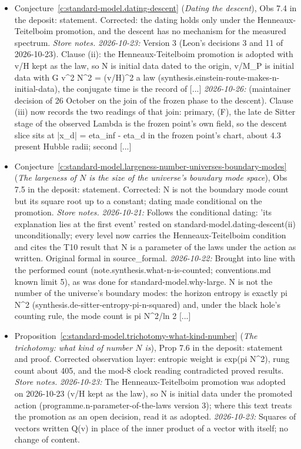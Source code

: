 \documentclass[11pt]{article}
\theoremstyle{definition}
\theoremstyle{plain}
\begin{document}
\begin{itemize}
\item Conjecture~\ref{c:standard-model.dating-descent} (\emph{Dating the descent}), Obs 7.4 in the deposit: statement. Corrected: the dating holds only under the Henneaux-Teitelboim promotion, and the descent has no mechanism for the measured spectrum. \emph{Store notes.} \emph{2026-10-23:} Version 3 (Leon's decisions 3 and 11 of 2026-10-23). Clause (ii): the Henneaux-Teitelboim promotion is adopted with v/H kept as the law, so N is initial data dated to the origin, v/M\_P is initial data with G v\^{}2 N\^{}2 = (v/H)\^{}2 a law (synthesis.einstein-route-makes-n-initial-data), the conjugate time is the record of [...] \emph{2026-10-26:} (maintainer decision of 26 October on the join of the frozen phase to the descent). Clause (iii) now records the two readings of that join: primary, (F), the late de Sitter stage of the observed Lambda is the frozen point's own field, so the descent slice sits at |x\_d| = eta\_inf - eta\_d in the frozen point's chart, about 4.3 present Hubble radii; second [...]
\item Conjecture~\ref{c:standard-model.largeness-number-universes-boundary-modes} (\emph{The largeness of $N$ is the size of the universe's boundary mode space}), Obs 7.5 in the deposit: statement. Corrected: N is not the boundary mode count but its square root up to a constant; dating made conditional on the promotion. \emph{Store notes.} \emph{2026-10-21:} Follows the conditional dating: 'its explanation lies at the first event' rested on standard-model.dating-descent(ii) unconditionally; every level now carries the Henneaux-Teitelboim condition and cites the T10 result that N is a parameter of the laws under the action as written. Original formal in source\_formal. \emph{2026-10-22:} Brought into line with the performed count (note.synthesis.what-n-is-counted; conventions.md known limit 5), as was done for standard-model.why-large. N is not the number of the universe's boundary modes: the horizon entropy is exactly pi N\^{}2 (synthesis.de-sitter-entropy-pi-n-squared) and, under the black hole's counting rule, the mode count is pi N\^{}2/ln 2 [...]
\item Proposition~\ref{c:standard-model.trichotomy-what-kind-number} (\emph{The trichotomy: what kind of number $N$ is}), Prop 7.6 in the deposit: statement and proof. Corrected observation layer: entropic weight is exp(pi N\^{}2), rung count about 405, and the mod-8 clock reading contradicted proved results. \emph{Store notes.} \emph{2026-10-23:} The Henneaux-Teitelboim promotion was adopted on 2026-10-23 (v/H kept as the law), so N is initial data under the promoted action (programme.n-parameter-of-the-laws version 3); where this text treats the promotion as an open decision, read it as adopted. \emph{2026-10-23:} Squares of vectors written Q(v) in place of the inner product of a vector with itself; no change of content.

\end{itemize}
\end{document}
